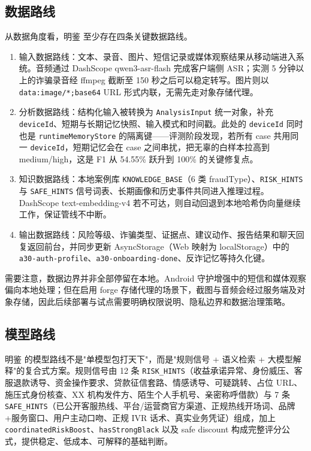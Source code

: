 \documentclass[UTF8,a4paper,12pt]{ctexart}
\begin{document}
\subsection{数据路线}

从数据角度看，明鉴 至少存在四条关键数据路线。

\begin{enumerate}
    \item 输入数据路线：文本、录音、图片、短信记录或媒体观察结果从移动端进入系统。音频通过 DashScope qwen3-asr-flash 完成客户端侧 ASR；实测 5 分钟以上的诈骗录音经 ffmpeg 截断至 150 秒之后可以稳定转写。图片则以 \texttt{data:image/*;base64} URL 形式内联，无需先走对象存储代理。
    \item 分析数据路线：结构化输入被转换为 \texttt{AnalysisInput} 统一对象，补充 \texttt{deviceId}、短期与长期记忆快照、输入模式和时间戳。此处的 \texttt{deviceId} 同时也是 \texttt{runtimeMemoryStore} 的隔离键——评测阶段发现，若所有 case 共用同一 \texttt{deviceId}，短期记忆会在 case 之间串扰，把无辜的白样本拉高到 medium/high，这是 F1 从 54.55\% 跃升到 100\% 的关键修复点。
    \item 知识数据路线：本地案例库 \texttt{KNOWLEDGE\_BASE}（6 类 fraudType）、\texttt{RISK\_HINTS} 与 \texttt{SAFE\_HINTS} 信号词表、长期画像和历史事件共同进入推理过程。DashScope text-embedding-v4 若不可达，则自动回退到本地哈希伪向量继续工作，保证管线不中断。
    \item 输出数据路线：风险等级、诈骗类型、证据点、建议动作、报告结果和聊天回复返回前台，并同步更新 AsyncStorage（Web 映射为 localStorage）中的 \texttt{a30-auth-profile}、\texttt{a30-onboarding-done}、反诈记忆等持久化键。
\end{enumerate}

需要注意，数据边界并非全部停留在本地。Android 守护增强中的短信和媒体观察偏向本地处理；但在启用 forge 存储代理的场景下，截图与音频会经过服务端及对象存储，因此后续部署与试点需要明确权限说明、隐私边界和数据治理策略。

\subsection{模型路线}

明鉴 的模型路线不是"单模型包打天下"，而是"规则信号 + 语义检索 + 大模型解释"的复合式方案。规则信号由 12 条 \texttt{RISK\_HINTS}（收益承诺异常、身份威压、客服退款诱导、资金操作要求、贷款征信套路、情感诱导、可疑跳转、占位 URL、施压式身份核查、XX 机构发件方、陌生个人手机号、亲密称呼借款）与 7 条 \texttt{SAFE\_HINTS}（已公开客服热线、平台/运营商官方渠道、正规热线开场词、品牌+服务窗口、用户主动口吻、正规 IVR 话术、真实业务凭证）组成，加上 \texttt{coordinatedRiskBoost}、\texttt{hasStrongBlack} 以及 safe discount 构成完整评分公式，提供稳定、低成本、可解释的基础判断。
\end{document}
